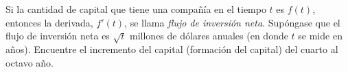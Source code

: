 \item Si la cantidad de capital que tiene una compañía en el tiempo $t$ es $f(t)$, entonces la derivada, $f'(t)$, se llama \textit{flujo de inversión neta}. Supóngase que el flujo de inversión neta es $\sqrt{t}$ millones de dólares anuales (en donde $t$ se mide en años). Encuentre el incremento del capital (formación del capital) del cuarto al octavo año.
